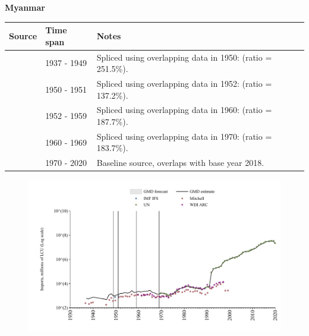 \documentclass[12pt,a4paper,landscape]{article}
\begin{document}
\begin{adjustbox}{max totalsize={\paperwidth}{\paperheight},center}
\begin{minipage}[t][\textheight][t]{\textwidth}
\vspace*{0.5cm}
{}
\begin{center}
{\Large\bfseries Myanmar}
\end{center}
\vspace{0.5cm}
\begin{table}[H]
\centering
\small
\begin{tabular}{|l|l|l|}
\hline
\textbf{Source} & \textbf{Time span} & \textbf{Notes} \\
\hline
\rowcolor{white}\cite{Mitchell}& 1937 - 1949 &Spliced using overlapping data in 1950: (ratio = 251.5\%).\\
\rowcolor{lightgray}\cite{IMF_IFS}& 1950 - 1951 &Spliced using overlapping data in 1952: (ratio = 137.2\%).\\
\rowcolor{white}\cite{Mitchell}& 1952 - 1959 &Spliced using overlapping data in 1960: (ratio = 187.7\%).\\
\rowcolor{lightgray}\cite{WDI_ARC}& 1960 - 1969 &Spliced using overlapping data in 1970: (ratio = 183.7\%).\\
\rowcolor{white}\cite{UN}& 1970 - 2020 &Baseline source, overlaps with base year 2018.\\
\hline
\end{tabular}
\end{table}
\begin{figure}[H]
\centering
\includegraphics[width=\textwidth,height=0.6\textheight,keepaspectratio]{graphs/MMR_imports.pdf}
\end{figure}
\end{minipage}
\end{adjustbox}
\end{document}
